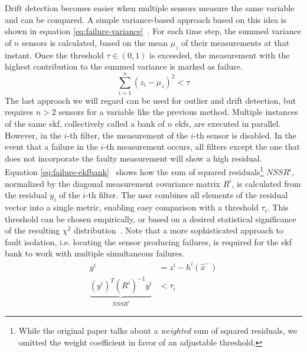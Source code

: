 Drift detection becomes easier when multiple sensors measure the same variable and can be compared. A simple variance-based approach based on this idea is shown in equation \ref{eq:failure-variance}~\cite[p.~20]{Kabzan.2019}. For each time step, the summed variance of $n$ sensors is calculated, based on the mean $\mu_z$ of their measurements at that instant. Once the threshold $\tau \in (0, 1)$ is exceeded, the measurement with the highest contribution to the summed variance is marked as failure.
\begin{equation}\label{eq:failure-variance}%
\sum_{i=1}^n (z_i - \mu_z)^2 < \tau%
\end{equation}
The last approach we will regard can be used for outlier and drift detection, but requires $n>2$ sensors for a variable like the previous method. Multiple instances of the same \gls{ekf}, collectively called a bank of $n$ \gls{ekf}s, are executed in parallel. However, in the $i$-th filter, the measurement of the $i$-th sensor is disabled. In the event that a failure in the $i$-th measurement occurs, all filters except the one that does not incorporate the faulty measurement will show a high residual. \\ Equation \ref{eq:failure-ekfbank}~\cite[p.~3]{Kobayashi.2003} shows how the sum of squared residuals\footnote{While the original paper talks about a \textit{weighted} sum of squared residuals, we omitted the weight coefficient in favor of an adjustable threshold.} $\textit{NSSR}^i$, normalized by the diagonal measurement covariance matrix $R^i$, is calculated from the residual $y_i$ of the $i$-th filter. The \gls{nssr} combines all elements of the residual vector into a single metric, enabling easy comparison with a threshold $\tau_i$. This threshold can be chosen empirically, or based on a desired statistical significance of the resulting $\chi^2$ distribution~\cite[p.~3]{Xue.2007}. Note that a more sophisticated approach to fault isolation, i.e. locating the sensor producing failures, is required for the \gls{ekf} bank to work with multiple simultaneous failures.
\begin{subequations}\label{eq:failure-ekfbank}
\begin{alignat}{2}%
y^i &= z^i - h^i(\hat{x}^-) \\%
\underbrace{(y^i)^T (R^i)^{-1} y^i}_\textrm{$\textit{NSSR}^i$} &< \tau_i%
\end{alignat}
\end{subequations}
